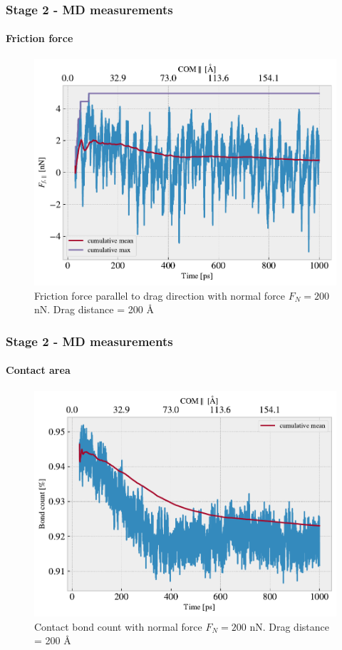 \documentclass[
	10pt, %
]{beamer}
\begin{document}
\begin{frame}
	\frametitle{Stage 2 - MD measurements}
	\framesubtitle{Friction force}

	
	\begin{figure}
		\includegraphics[width=0.7\linewidth]{figures/drag2.pdf}
		\caption{Friction force parallel to drag direction with normal force $F_N = 200$ nN. Drag distance = 200 Å}
	\end{figure}	
	
\end{frame}



\begin{frame}
	\frametitle{Stage 2 - MD measurements}
	\framesubtitle{Contact area}

	
	\begin{figure}
		\includegraphics[width=0.7\linewidth]{figures/contact1.pdf}
		\caption{Contact bond count with normal force $F_N = 200$ nN. Drag distance = 200 Å}
	\end{figure}	
	
\end{frame}
\end{document}
